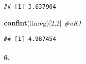\documentclass[
]{article}
\newenvironment{Shaded}{\begin{snugshade}}{\end{snugshade}}
\newcommand{\CommentTok}[1]{\textcolor[rgb]{0.56,0.35,0.01}{\textit{#1}}}
\newcommand{\DecValTok}[1]{\textcolor[rgb]{0.00,0.00,0.81}{#1}}
\newcommand{\KeywordTok}[1]{\textcolor[rgb]{0.13,0.29,0.53}{\textbf{#1}}}
\newcommand{\NormalTok}[1]{#1}
\begin{document}
\begin{verbatim}
## [1] 3.637904
\end{verbatim}

\begin{Shaded}
\begin{Highlighting}[]
\KeywordTok{confint}\NormalTok{(linreg)[}\DecValTok{2}\NormalTok{,}\DecValTok{2}\NormalTok{] }\CommentTok{#uKI}
\end{Highlighting}
\end{Shaded}

\begin{verbatim}
## [1] 4.987454
\end{verbatim}

\hypertarget{section-8}{%
\paragraph{\texorpdfstring{\textbf{6.}}{6.}}\label{section-8}}
\end{document}
